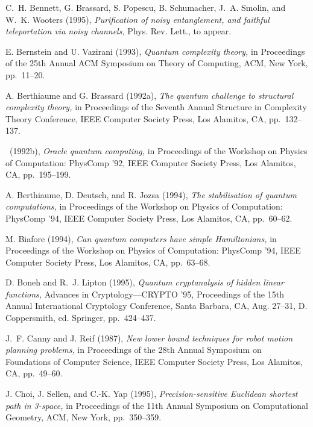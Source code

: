 {\begin{thebibliography}{}
 {\sc C.~H. Bennett, 
G. Brassard, S. Popescu, B. Schumacher, J.~A. Smolin, and W.~K. Wooters} 
(1995), {\em Purification of noisy entanglement,
and faithful teleportation via noisy channels,} Phys. Rev. Lett., to appear.

  {\sc E. Bernstein and 
U. Vazirani} (1993), {\em Quantum complexity theory,} in {Proceedings of 
the 25th Annual ACM Symposium on Theory of Computing,} ACM, New York, 
pp.~11--20.

  {\sc A. Berthiaume and 
G. Brassard} (1992a), {\em The quantum challenge to structural complexity 
theory,} in {Proceedings of the Seventh Annual Structure in 
Complexity Theory Conference,} IEEE Computer Society Press, 
Los Alamitos, CA, pp.~132--137.

  \sameauthor\  
(1992b), {\em Oracle quantum computing,} in {Proceedings of the Workshop on 
Physics of Computation: PhysComp '92,} IEEE Computer Society Press, Los 
Alamitos, CA, pp.~195--199.

  {\sc A. Berthiaume, D. Deutsch, and
R. Jozsa} (1994), {\em The stabilisation of quantum computations,} in 
{Proceedings of the Workshop on Physics of Computation: PhysComp '94,} 
IEEE Computer Society Press, Los Alamitos, CA, pp.~60--62.

  {\sc M. Biafore} (1994), {\em Can quantum 
computers have simple Hamiltonians,} in 
{Proceedings of the Workshop on Physics of Computation: PhysComp '94,} 
IEEE Computer Society Press, Los Alamitos, CA, pp.~63--68.

 {\sc D. Boneh and R.~J. Lipton} (1995),
{\em Quantum cryptanalysis of hidden linear functions,} {Advances
in Cryptology---CRYPTO '95,} Proceedings of the 15th Annual International
Cryptology Conference, Santa Barbara, CA, Aug. 27--31, D. Coppersmith, ed.
Springer, pp.~424--437.

 {\sc J.~F. Canny and J. Reif} (1987),
{\em New lower bound techniques for robot motion planning problems,} in 
{Proceedings of the 28th Annual Symposium on Foundations of Computer 
Science,} IEEE Computer Society Press, Los Alamitos, CA, pp.~49--60.

 {\sc J. Choi, J. Sellen, and C.-K. Yap}
(1995), {\em Precision-sensitive Euclidean shortest path in {\rm 3}-space,} 
in {Proceedings of the 11th Annual Symposium on Computational Geometry,}
ACM, New York, pp.~350--359.


\end{thebibliography}}
